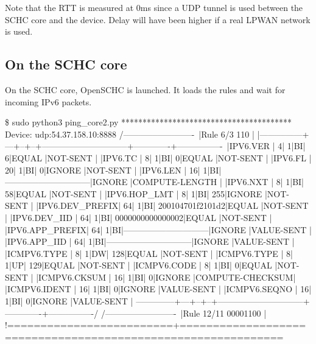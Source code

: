 Note that the \ac{RTT} is measured at 0ms since a UDP tunnel is used between the SCHC core and the device. 
Delay will have been higher if a real \ac{LPWAN} network is used.

\subsection{On the SCHC core}

On the SCHC core, OpenSCHC is launched. It loads the rules and wait for incoming IPv6 packets.

\begin{termc}[backgroundcolor=\color{palerod}, basicstyle=\ttfamily\tiny]
\$ sudo python3 ping_core2.py 
****************************************
Device: udp:54.37.158.10:8888
/-------------------------\
|Rule 6/3            110  |
|---------------+---+--+--+------------------------------+-------------+----------------\
|IPV6.VER       |  4| 1|BI|                             6|EQUAL        |NOT-SENT        |
|IPV6.TC        |  8| 1|BI|                             0|EQUAL        |NOT-SENT        |
|IPV6.FL        | 20| 1|BI|                             0|IGNORE       |NOT-SENT        |
|IPV6.LEN       | 16| 1|BI|------------------------------|IGNORE       |COMPUTE-LENGTH  |
|IPV6.NXT       |  8| 1|BI|                            58|EQUAL        |NOT-SENT        |
|IPV6.HOP_LMT   |  8| 1|BI|                           255|IGNORE       |NOT-SENT        |
|IPV6.DEV_PREFIX| 64| 1|BI|              200104701f2101d2|EQUAL        |NOT-SENT        |
|IPV6.DEV_IID   | 64| 1|BI|              0000000000000002|EQUAL        |NOT-SENT        |
|IPV6.APP_PREFIX| 64| 1|BI|------------------------------|IGNORE       |VALUE-SENT      |
|IPV6.APP_IID   | 64| 1|BI|------------------------------|IGNORE       |VALUE-SENT      |
|ICMPV6.TYPE    |  8| 1|DW|                           128|EQUAL        |NOT-SENT        |
|ICMPV6.TYPE    |  8| 1|UP|                           129|EQUAL        |NOT-SENT        |
|ICMPV6.CODE    |  8| 1|BI|                             0|EQUAL        |NOT-SENT        |
|ICMPV6.CKSUM   | 16| 1|BI|                             0|IGNORE       |COMPUTE-CHECKSUM|
|ICMPV6.IDENT   | 16| 1|BI|                             0|IGNORE       |VALUE-SENT      |
|ICMPV6.SEQNO   | 16| 1|BI|                             0|IGNORE       |VALUE-SENT      |
\---------------+---+--+--+------------------------------+-------------+----------------/
/-------------------------\
|Rule 12/11     00001100  |
!=========================+=============================================================\

\end{termc}
